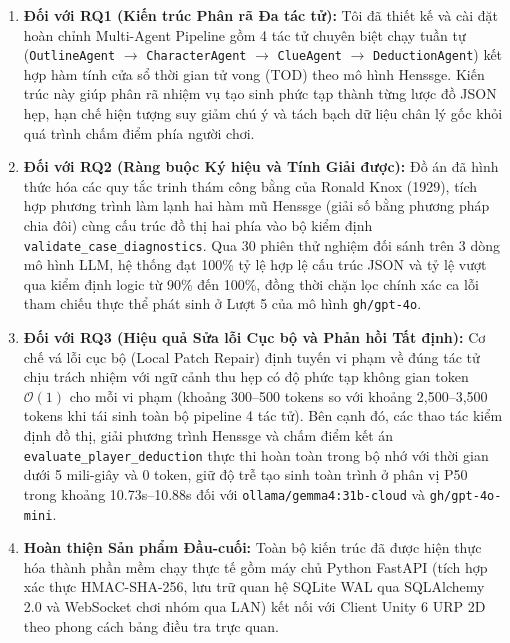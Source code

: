 \begin{enumerate}[leftmargin=1.5cm]
    \item \textbf{Đối với RQ1 (Kiến trúc Phân rã Đa tác tử):} Tôi đã thiết kế và cài đặt hoàn chỉnh Multi-Agent Pipeline gồm 4 tác tử chuyên biệt chạy tuần tự (\texttt{OutlineAgent} $\to$ \texttt{CharacterAgent} $\to$ \texttt{ClueAgent} $\to$ \texttt{DeductionAgent}) kết hợp hàm tính cửa sổ thời gian tử vong (TOD) theo mô hình Henssge. Kiến trúc này giúp phân rã nhiệm vụ tạo sinh phức tạp thành từng lược đồ JSON hẹp, hạn chế hiện tượng suy giảm chú ý và tách bạch dữ liệu chân lý gốc khỏi quá trình chấm điểm phía người chơi.
    
    \item \textbf{Đối với RQ2 (Ràng buộc Ký hiệu và Tính Giải được):} Đồ án đã hình thức hóa các quy tắc trinh thám công bằng của Ronald Knox (1929), tích hợp phương trình làm lạnh hai hàm mũ Henssge (giải số bằng phương pháp chia đôi) cùng cấu trúc đồ thị hai phía vào bộ kiểm định \texttt{validate\_case\_diagnostics}. Qua 30 phiên thử nghiệm đối sánh trên 3 dòng mô hình LLM, hệ thống đạt 100\% tỷ lệ hợp lệ cấu trúc JSON và tỷ lệ vượt qua kiểm định logic từ 90\% đến 100\%, đồng thời chặn lọc chính xác ca lỗi tham chiếu thực thể phát sinh ở Lượt 5 của mô hình \texttt{gh/gpt-4o}.
    
    \item \textbf{Đối với RQ3 (Hiệu quả Sửa lỗi Cục bộ và Phản hồi Tất định):} Cơ chế vá lỗi cục bộ (Local Patch Repair) định tuyến vi phạm về đúng tác tử chịu trách nhiệm với ngữ cảnh thu hẹp có độ phức tạp không gian token $\mathcal{O}(1)$ cho mỗi vi phạm (khoảng 300--500 tokens so với khoảng 2,500--3,500 tokens khi tái sinh toàn bộ pipeline 4 tác tử). Bên cạnh đó, các thao tác kiểm định đồ thị, giải phương trình Henssge và chấm điểm kết án \texttt{evaluate\_player\_deduction} thực thi hoàn toàn trong bộ nhớ với thời gian dưới 5 mili-giây và 0 token, giữ độ trễ tạo sinh toàn trình ở phân vị P50 trong khoảng 10.73s--10.88s đối với \texttt{ollama/gemma4:31b-cloud} và \texttt{gh/gpt-4o-mini}.
    
    \item \textbf{Hoàn thiện Sản phẩm Đầu-cuối:} Toàn bộ kiến trúc đã được hiện thực hóa thành phần mềm chạy thực tế gồm máy chủ Python FastAPI (tích hợp xác thực HMAC-SHA-256, lưu trữ quan hệ SQLite WAL qua SQLAlchemy 2.0 và WebSocket chơi nhóm qua LAN) kết nối với Client Unity 6 URP 2D theo phong cách bảng điều tra trực quan.
\end{enumerate}

